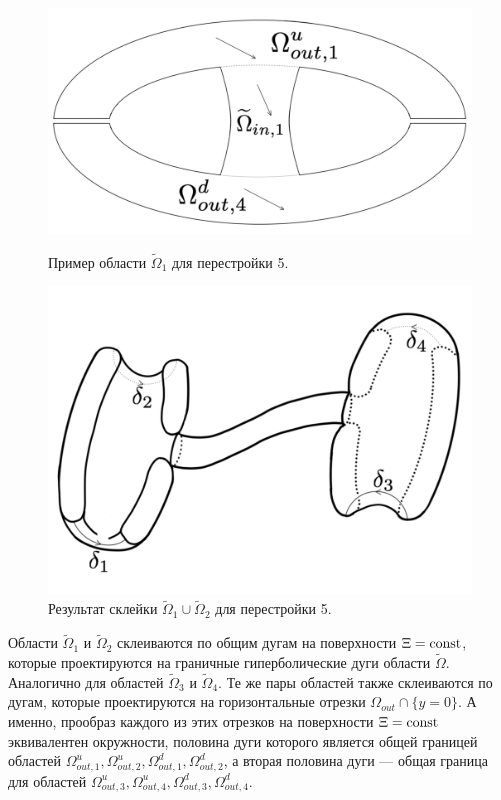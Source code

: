 \begin{figure}[!htb]
\centering
\includegraphics[scale=0.1]{images/section2/atoms/atom_5_domain.pdf}
    \caption{Пример области $\widetilde{\Omega}_1$ для перестройки 5.}
    \label{fig:pt9:_domain_atom_hyp_foc}
\endminipage\hfill
{}
\centering
\includegraphics[scale=0.12]{images/section2/atoms/atom_5_half.pdf}
    \caption{Результат склейки $\widetilde{\Omega}_1 \cup \widetilde{\Omega}_2$ для перестройки 5.}
    \label{fig:pt9:_atom_5_half}
\endminipage\hfill
\end{figure}

Области $\widetilde{\Omega}_1$ и $\widetilde{\Omega}_2$ склеиваются по общим дугам на поверхности $\Xi = \mathrm{const}$, которые проектируются на граничные гиперболические дуги области $\widetilde{\Omega}$. Аналогично для областей $\widetilde{\Omega}_3$ и $\widetilde{\Omega}_4$. 
Те же пары областей также склеиваются по дугам, которые проектируются на горизонтальные отрезки $\Omega_{out} \cap \{y=0\}$. А именно, прообраз каждого из этих отрезков на поверхности $\Xi = \mathrm{const}$ эквивалентен окружности, половина дуги которого является общей границей областей $\Omega_{out, 1}^u, \Omega_{out, 2}^u, \Omega_{out, 1}^d, \Omega_{out, 2}^d$, а вторая половина дуги --- общая граница для областей $\Omega_{out, 3}^u, \Omega_{out, 4}^u, \Omega_{out, 3}^d, \Omega_{out, 4}^d$. 

